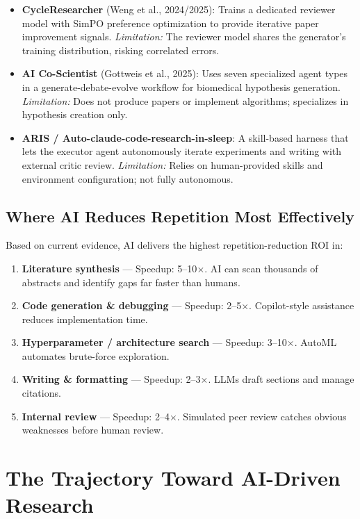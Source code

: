 \documentclass[11pt,a4paper]{article}
\begin{document}
\begin{itemize}[leftmargin=2em]
    \item \textbf{CycleResearcher} (Weng et al., 2024/2025): Trains a dedicated reviewer model with SimPO preference optimization to provide iterative paper improvement signals. \textit{Limitation:} The reviewer model shares the generator's training distribution, risking correlated errors.
    \item \textbf{AI Co-Scientist} (Gottweis et al., 2025): Uses seven specialized agent types in a generate-debate-evolve workflow for biomedical hypothesis generation. \textit{Limitation:} Does not produce papers or implement algorithms; specializes in hypothesis creation only.
    \item \textbf{ARIS / Auto-claude-code-research-in-sleep}: A skill-based harness that lets the executor agent autonomously iterate experiments and writing with external critic review. \textit{Limitation:} Relies on human-provided skills and environment configuration; not fully autonomous.
\end{itemize}

\subsection{Where AI Reduces Repetition Most Effectively}

Based on current evidence, AI delivers the highest repetition-reduction ROI in:
\begin{enumerate}[leftmargin=2em]
    \item \textbf{Literature synthesis} --- Speedup: 5--10$\times$. AI can scan thousands of abstracts and identify gaps far faster than humans.
    \item \textbf{Code generation \& debugging} --- Speedup: 2--5$\times$. Copilot-style assistance reduces implementation time.
    \item \textbf{Hyperparameter / architecture search} --- Speedup: 3--10$\times$. AutoML automates brute-force exploration.
    \item \textbf{Writing \& formatting} --- Speedup: 2--3$\times$. LLMs draft sections and manage citations.
    \item \textbf{Internal review} --- Speedup: 2--4$\times$. Simulated peer review catches obvious weaknesses before human review.
\end{enumerate}

\section{The Trajectory Toward AI-Driven Research}
\end{document}
